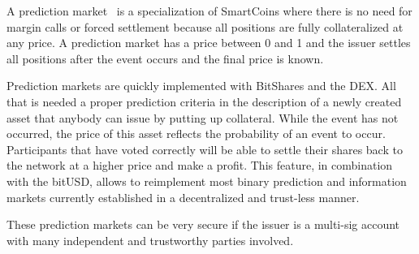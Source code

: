 A prediction market~\cite{wiki_pm} is a specialization of SmartCoins where
there is no need for margin calls or forced settlement because all positions
are fully collateralized at any price. A prediction market has a price between
0 and 1 and the issuer settles all positions after the event occurs and the
final price is known.

Prediction markets are quickly implemented with BitShares and the DEX. All that
is needed a proper prediction criteria in the description of a newly created
asset that anybody can issue by putting up collateral. While the event has not
occurred, the price of this asset reflects the probability of an event to
occur. Participants that have voted correctly will be able to settle their shares
back to the network at a higher price and make a profit. This feature, in
combination with the bitUSD, allows to reimplement most binary prediction and
information markets currently established in a decentralized and trust-less
manner.

These prediction markets can be very secure if the issuer is a multi-sig
account with many independent and trustworthy parties involved.
